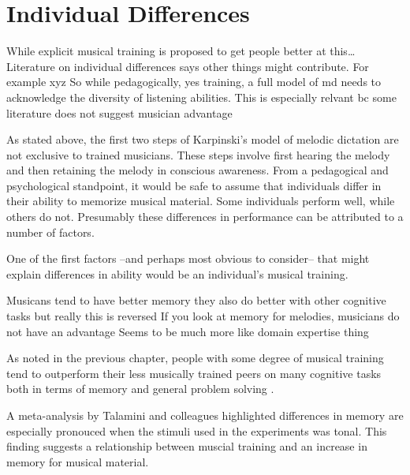 \documentclass[]{book}
\begin{document}
\hypertarget{individual-differences-2}{%
\section{Individual Differences}\label{individual-differences-2}}

While explicit musical training is proposed to get people better at this\ldots{}
Literature on individual differences says other things might contribute.
For example xyz
So while pedagogically, yes training, a full model of md needs to acknowledge the diversity of listening abilities.
This is especially relvant bc some literature does not suggest musician advantage

As stated above, the first two steps of Karpinski's model of melodic dictation are not exclusive to trained musicians.
These steps involve first hearing the melody and then retaining the melody in conscious awareness.
From a pedagogical and psychological standpoint, it would be safe to assume that individuals differ in their ability to memorize musical material.
Some individuals perform well, while others do not.
Presumably these differences in performance can be attributed to a number of factors.

One of the first factors --and perhaps most obvious to consider-- that might explain differences in ability would be an individual's musical training.

Musicans tend to have better memory
they also do better with other cognitive tasks
but really this is reversed
If you look at memory for melodies, musicians do not have an advantage
Seems to be much more like domain expertise thing

As noted in the previous chapter, people with some degree of musical training tend to outperform their less musically trained peers on many cognitive tasks both in terms of memory and general problem solving \citep{schellenbergMusicNonmusicalAbilities2017}.

A meta-analysis by Talamini and colleagues \citep{talaminiMusiciansHaveBetter2017} highlighted differences in memory are especially pronouced when the stimuli used in the experiments was tonal.
This finding suggests a relationship between muscial training and an increase in memory for musical material.
\end{document}
